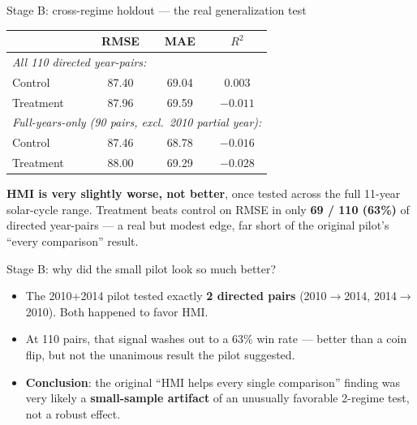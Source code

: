 \documentclass[11pt]{beamer}
\begin{document}
\begin{frame}{Stage B: cross-regime holdout --- the real generalization test}
\begin{table}
\centering
\small
\begin{tabular}{lccc}
\toprule
& RMSE & MAE & $R^2$ \\
\midrule
\multicolumn{4}{l}{\textit{All 110 directed year-pairs:}} \\
Control & 87.40 & 69.04 & 0.003 \\
Treatment & 87.96 & 69.59 & $-0.011$ \\
\midrule
\multicolumn{4}{l}{\textit{Full-years-only (90 pairs, excl.\ 2010 partial year):}} \\
Control & 87.46 & 68.78 & $-0.016$ \\
Treatment & 88.00 & 69.29 & $-0.028$ \\
\bottomrule
\end{tabular}
\end{table}
\textbf{HMI is very slightly worse, not better}, once tested across the full 11-year solar-cycle range. Treatment beats control on RMSE in only \textbf{69 / 110 (63\%)} of directed year-pairs --- a real but modest edge, far short of the original pilot's ``every comparison'' result.
\end{frame}

\begin{frame}{Stage B: why did the small pilot look so much better?}
\begin{itemize}
  \item The 2010+2014 pilot tested exactly \textbf{2 directed pairs} (2010$\to$2014, 2014$\to$2010). Both happened to favor HMI.
  \item At 110 pairs, that signal washes out to a 63\% win rate --- better than a coin flip, but not the unanimous result the pilot suggested.
  \item \textbf{Conclusion}: the original ``HMI helps every single comparison'' finding was very likely a \textbf{small-sample artifact} of an unusually favorable 2-regime test, not a robust effect.
\end{itemize}
\end{frame}
\end{document}
